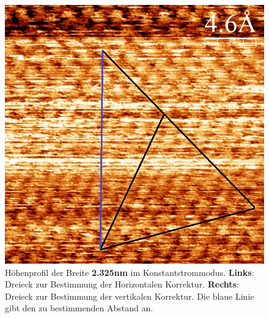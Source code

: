 \documentclass[12pt,a4paper]{article}
\begin{document}
\begin{figure}[H]
\includegraphics[scale=0.36]{Bilder/Atome/strom2_v.jpg}
\caption{Höhenprofil der Breite \textbf{2.325nm} im Konstantstrommodus. \textbf{Links}: Dreieck zur Bestimmung der Horizontalen Korrektur. \textbf{Rechts}: Dreieck zur Bestimmung der vertikalen Korrektur. Die blaue Linie gibt den zu bestimmenden Abstand an.}
\end{figure}
\end{document}
